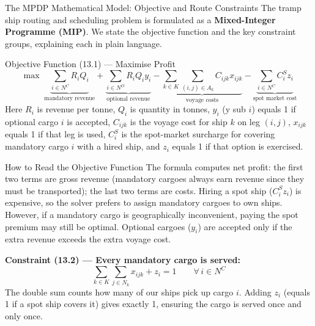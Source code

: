 \documentclass[aspectratio=169,10pt]{beamer}
\begin{document}
\begin{frame}[allowframebreaks]{The MPDP Mathematical Model: Objective and Route Constraints}
  The tramp ship routing and scheduling problem is formulated as a
  \textbf{Mixed-Integer Programme (MIP)}.  We state the objective function
  and the key constraint groups, explaining each in plain language.

  \medskip
  \begin{block}{Objective Function (13.1) --- Maximise Profit}
    \begin{equation}
      \max \; \underbrace{\sum_{i \in N^C} R_i Q_i}_{\text{mandatory revenue}}
           + \underbrace{\sum_{i \in N^O} R_i Q_i y_i}_{\text{optional revenue}}
           - \underbrace{\sum_{k \in K} \sum_{(i,j) \in A_k} C_{ijk} x_{ijk}}_{\text{voyage costs}}
           - \underbrace{\sum_{i \in N^C} C_i^S z_i}_{\text{spot market cost}}
      \tag{13.1}
    \end{equation}
    Here $R_i$ is revenue per tonne, $Q_i$ is quantity in tonnes, $y_i$
    (y sub $i$) equals 1 if optional cargo $i$ is accepted, $C_{ijk}$ is
    the voyage cost for ship $k$ on leg $(i,j)$, $x_{ijk}$ equals 1 if
    that leg is used, $C_i^S$ is the spot-market surcharge for covering
    mandatory cargo $i$ with a hired ship, and $z_i$ equals 1 if that
    option is exercised.
  \end{block}

  \begin{alertblock}{How to Read the Objective Function}
    The formula computes net profit: the first two terms are gross revenue
    (mandatory cargoes always earn revenue since they must be transported);
    the last two terms are costs.  Hiring a spot ship ($C_i^S z_i$) is
    expensive, so the solver prefers to assign mandatory cargoes to own ships.
    However, if a mandatory cargo is geographically inconvenient, paying the
    spot premium may still be optimal.  Optional cargoes ($y_i$) are accepted
    only if the extra revenue exceeds the extra voyage cost.
  \end{alertblock}

  \bigskip
  \textbf{Constraint (13.2) --- Every mandatory cargo is served:}
  \begin{equation}
    \sum_{k \in K} \sum_{j \in N_k} x_{ijk} + z_i = 1
    \qquad \forall\, i \in N^C
    \tag{13.2}
  \end{equation}
  The double sum counts how many of our ships pick up cargo $i$.  Adding
  $z_i$ (equals 1 if a spot ship covers it) gives exactly 1, ensuring the
  cargo is served once and only once.


\end{frame}
\end{document}
